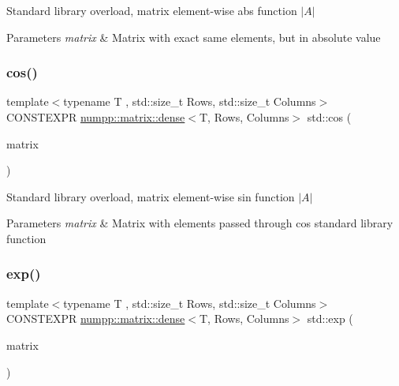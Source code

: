 Standard library overload, matrix element-\/wise abs function $|A|$


\begin{DoxyParams}{Parameters}
{\em matrix} & Matrix with exact same elements, but in absolute value\\
\hline
\end{DoxyParams}
\mbox{\label{group__numpp__structures__matrices__dense_gaf4c3368b8cb2cdb05c0dd5a4d1790480}} 
\subsubsection{\texorpdfstring{cos()}{cos()}}
{\footnotesize\ttfamily template$<$typename T , std\+::size\+\_\+t Rows, std\+::size\+\_\+t Columns$>$ \\
C\+O\+N\+S\+T\+E\+X\+PR \hyperlink{classnumpp_1_1matrix_1_1dense}{numpp\+::matrix\+::dense}$<$T, Rows, Columns$>$ std\+::cos (\begin{DoxyParamCaption}\item[{const \hyperlink{classnumpp_1_1matrix_1_1dense}{numpp\+::matrix\+::dense}$<$ T, Rows, Columns $>$ \&}]{matrix }\end{DoxyParamCaption})}

Standard library overload, matrix element-\/wise sin function $|A|$


\begin{DoxyParams}{Parameters}
{\em matrix} & Matrix with elements passed through cos standard library function\\
\hline
\end{DoxyParams}
\mbox{\label{group__numpp__structures__matrices__dense_ga5455e1c6ea8020055f4873c6c07d5810}} 
\subsubsection{\texorpdfstring{exp()}{exp()}}
{\footnotesize\ttfamily template$<$typename T , std\+::size\+\_\+t Rows, std\+::size\+\_\+t Columns$>$ \\
C\+O\+N\+S\+T\+E\+X\+PR \hyperlink{classnumpp_1_1matrix_1_1dense}{numpp\+::matrix\+::dense}$<$T, Rows, Columns$>$ std\+::exp (\begin{DoxyParamCaption}\item[{const \hyperlink{classnumpp_1_1matrix_1_1dense}{numpp\+::matrix\+::dense}$<$ T, Rows, Columns $>$ \&}]{matrix }\end{DoxyParamCaption})}

